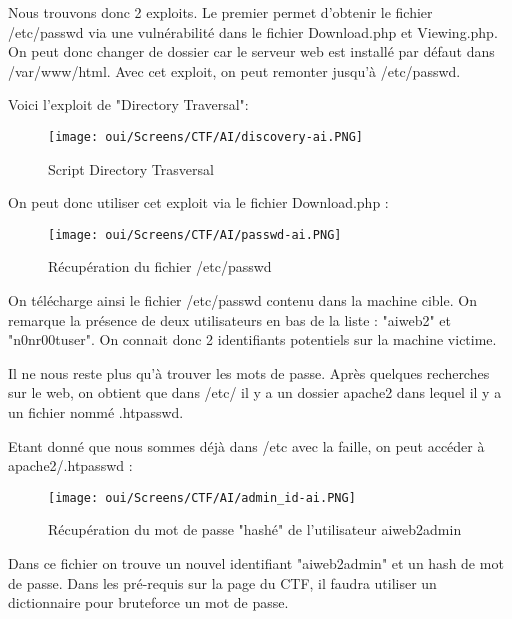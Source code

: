 \noindent Nous trouvons donc 2 exploits. Le premier permet d'obtenir le fichier /etc/passwd via une vulnérabilité dans le fichier Download.php et Viewing.php. On peut donc changer de dossier car le serveur web est installé par défaut dans /var/www/html. Avec cet exploit, on peut remonter jusqu'à /etc/passwd.

\noindent Voici l'exploit de "Directory Traversal":

\begin{figure}[htp!]
  \centering
  \setlength\figureheight{7cm}
  \setlength\figurewidth{9cm}
  \texttt{[image: oui/Screens/CTF/AI/discovery-ai.PNG]}
  \caption{Script Directory Trasversal}
  \label{fig:courbe-tikz}
\end{figure}

\noindent On peut donc utiliser cet exploit via le fichier Download.php :

\begin{figure}[htp!]
  \centering
  \setlength\figureheight{7cm}
  \setlength\figurewidth{9cm}
  \texttt{[image: oui/Screens/CTF/AI/passwd-ai.PNG]}
  \caption{Récupération du fichier /etc/passwd}
  \label{fig:courbe-tikz}
\end{figure}

\newpage
\noindent On télécharge ainsi le fichier /etc/passwd contenu dans la machine cible. On remarque la présence de deux utilisateurs en bas de la liste : "aiweb2" et "n0nr00tuser".  On connait donc 2 identifiants potentiels sur la machine victime.

\noindent Il ne nous reste plus qu'à  trouver les mots de passe. Après quelques recherches sur le web, on obtient que dans /etc/ il y a un dossier apache2 dans lequel il y a un fichier nommé .htpasswd.

\noindent Etant donné que nous sommes déjà dans /etc avec la faille, on peut accéder à apache2/.htpasswd :

\begin{figure}[htp!]
  \centering
  \setlength\figureheight{7cm}
  \setlength\figurewidth{9cm}
  \texttt{[image: oui/Screens/CTF/AI/admin\_id-ai.PNG]}
  \caption{Récupération du mot de passe "hashé" de l'utilisateur aiweb2admin}
  \label{fig:courbe-tikz}
\end{figure}

\noindent Dans ce fichier on trouve un nouvel identifiant "aiweb2admin" et un hash de mot de passe. Dans les pré-requis sur la page du CTF, il faudra utiliser un dictionnaire pour bruteforce un mot de passe.

